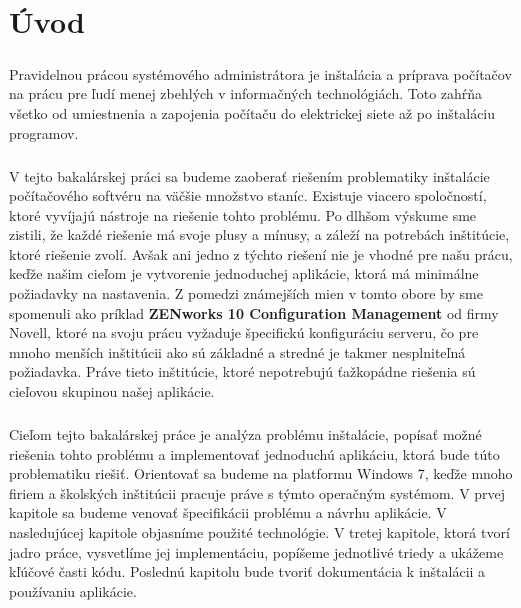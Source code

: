 \chapter*{Úvod}
\paragraph{}
Pravidelnou prácou systémového administrátora je inštalácia a príprava počítačov na prácu pre ľudí menej zbehlých v informačných technológiách. Toto zahŕňa všetko od umiestnenia a zapojenia počítaču do elektrickej siete až po inštaláciu programov.

\paragraph{}
V tejto bakalárskej práci sa budeme zaoberať riešením problematiky inštalácie počítačového softvéru na väčšie množstvo staníc. Existuje viacero spoločností, ktoré vyvíjajú nástroje na riešenie tohto problému. Po dlhšom výskume sme zistili, že každé riešenie má svoje plusy a mínusy, a záleží na potrebách inštitúcie, ktoré riešenie zvolí. Avšak ani jedno z týchto riešení nie je vhodné pre našu prácu, keďže našim cieľom je vytvorenie jednoduchej aplikácie, ktorá má minimálne požiadavky na nastavenia. Z pomedzi známejších mien v tomto obore by sme spomenuli ako príklad \textbf{ZENworks 10 Configuration Management} od firmy Novell, ktoré na svoju prácu vyžaduje špecifickú konfiguráciu serveru, čo pre mnoho menších inštitúcii ako sú základné a stredné je takmer nesplniteľná požiadavka. Práve tieto inštitúcie, ktoré nepotrebujú ťažkopádne riešenia sú cieľovou skupinou našej aplikácie. 

\paragraph{}
Cieľom tejto bakalárskej práce je analýza problému inštalácie, popísať možné riešenia tohto problému a implementovať jednoduchú aplikáciu, ktorá bude túto problematiku riešiť. Orientovať sa budeme na platformu Windows 7, keďže mnoho firiem a školských inštitúcii pracuje práve s týmto operačným systémom.
V prvej kapitole sa budeme venovať špecifikácii problému a návrhu aplikácie. V nasledujúcej kapitole objasníme použité technológie. V tretej kapitole, ktorá tvorí jadro práce, vysvetlíme jej implementáciu, popíšeme jednotlivé triedy a ukážeme kľúčové časti kódu. Poslednú kapitolu bude tvoriť dokumentácia k inštalácii a používaniu aplikácie.

